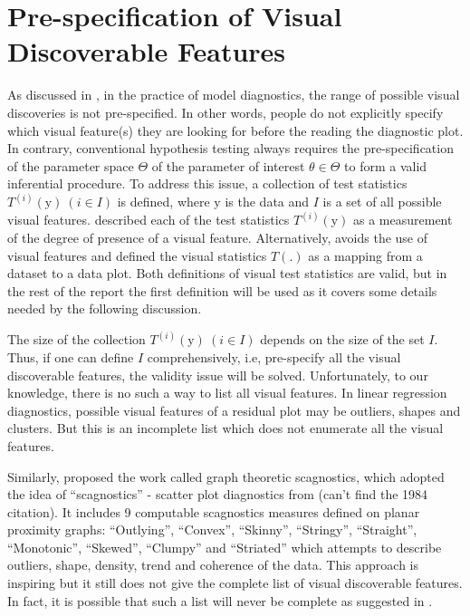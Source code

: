 \documentclass{monashthesis}
\theoremstyle{definition}
\theoremstyle{definition}
\theoremstyle{definition}
\theoremstyle{definition}
\theoremstyle{remark}
\begin{document}
\hypertarget{se:prespecification}{%
\section{Pre-specification of Visual Discoverable Features}\label{se:prespecification}}

As discussed in \textcite{buja_statistical_2009}, in the practice of model diagnostics, the range of possible visual discoveries is not pre-specified. In other words, people do not explicitly specify which visual feature(s) they are looking for before the reading the diagnostic plot. In contrary, conventional hypothesis testing always requires the pre-specification of the parameter space \(\Theta\) of the parameter of interest \(\theta \in \Theta\) to form a valid inferential procedure. To address this issue, a collection of test statistics \(T^{(i)}(\boldsymbol{\mathrm{y}})~(i \in I)\) is defined, where \(\boldsymbol{\mathrm{y}}\) is the data and \(I\) is a set of all possible visual features. \textcite{buja_statistical_2009} described each of the test statistics \(T^{(i)}(\boldsymbol{\mathrm{y}})\) as a measurement of the degree of presence of a visual feature. Alternatively, \textcite{majumder_validation_2013} avoids the use of visual features and defined the visual statistics \(T(.)\) as a mapping from a dataset to a data plot. Both definitions of visual test statistics are valid, but in the rest of the report the first definition will be used as it covers some details needed by the following discussion.

The size of the collection \(T^{(i)}(\boldsymbol{\mathrm{y}})~(i \in I)\) depends on the size of the set \(I\). Thus, if one can define \(I\) comprehensively, i.e, pre-specify all the visual discoverable features, the validity issue will be solved. Unfortunately, to our knowledge, there is no such a way to list all visual features. In linear regression diagnostics, possible visual features of a residual plot may be outliers, shapes and clusters. But this is an incomplete list which does not enumerate all the visual features.

Similarly, \textcite{wilkinson_graph-theoretic_2005} proposed the work called graph theoretic scagnostics, which adopted the idea of ``scagnostics'' - scatter plot diagnostics from (can't find the 1984 citation). It includes 9 computable scagnostics measures defined on planar proximity graphs: ``Outlying'', ``Convex'', ``Skinny'', ``Stringy'', ``Straight'', ``Monotonic'', ``Skewed'', ``Clumpy'' and ``Striated'' which attempts to describe outliers, shape, density, trend and coherence of the data. This approach is inspiring but it still does not give the complete list of visual discoverable features. In fact, it is possible that such a list will never be complete as suggested in \textcite{buja_statistical_2009}.
\end{document}
